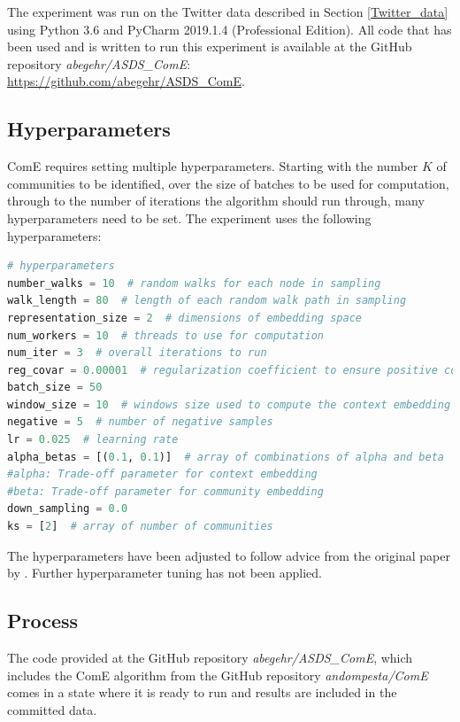 \documentclass[sigconf]{acmart}
\begin{document}
The experiment was run on the Twitter data described in Section \ref{Twitter_data} using Python 3.6 and PyCharm 2019.1.4 (Professional Edition). All code that has been used and is written to run this experiment is available at the GitHub repository \textit{abegehr/ASDS\_ComE}:\\\url{https://github.com/abegehr/ASDS_ComE}.\cite{asds}

\subsection{Hyperparameters}

ComE requires setting multiple hyperparameters. Starting with the number $K$ of communities to be identified, over the size of batches to be used for computation, through to the number of iterations the algorithm should run through, many hyperparameters need to be set.
The experiment uses the following hyperparameters:\cite{Cav17}

\begin{lstlisting}[language=python]
# hyperparameters
number_walks = 10  # random walks for each node in sampling
walk_length = 80  # length of each random walk path in sampling
representation_size = 2  # dimensions of embedding space
num_workers = 10  # threads to use for computation
num_iter = 3  # overall iterations to run
reg_covar = 0.00001  # regularization coefficient to ensure positive covariance
batch_size = 50
window_size = 10  # windows size used to compute the context embedding
negative = 5  # number of negative samples
lr = 0.025  # learning rate
alpha_betas = [(0.1, 0.1)]  # array of combinations of alpha and beta
#alpha: Trade-off parameter for context embedding
#beta: Trade-off parameter for community embedding
down_sampling = 0.0
ks = [2]  # array of number of communities
\end{lstlisting}

The hyperparameters have been adjusted to follow advice from the original paper by \citet{Cav17}. Further hyperparameter tuning has not been applied.

\subsection{Process}

The code provided at the GitHub repository \textit{abegehr/ASDS\_ComE}\cite{asds}, which includes the ComE algorithm from the GitHub repository \textit{andompesta/ComE}\cite{ComE} comes in a state where it is ready to run and results are included in the committed data.
\end{document}
